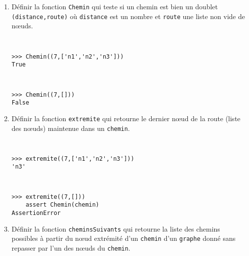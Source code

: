 \begin{question}\label{question:suivants}\mbox{}
\begin{enumerate}
\item Définir la fonction \texttt{Chemin} qui teste si un chemin est bien un doublet
	\texttt{(distance,route)} où \texttt{distance} est un nombre et \texttt{route} une liste 
	non vide de n\oe uds.

\noindent\begin{minipage}[t]{6cm}\tt\footnotesize
\begin{Verbatim}
>>> Chemin((7,['n1','n2','n3']))
True
\end{Verbatim}
\end{minipage}
\hfill
\begin{minipage}[t]{6cm}\tt\footnotesize
\begin{Verbatim}
>>> Chemin((7,[]))
False
\end{Verbatim}
\end{minipage}
\vspace*{2mm}

\item Définir la fonction \texttt{extremite} qui retourne le dernier n\oe ud de la route
	(liste des n\oe uds) maintenue dans un \texttt{chemin}.

\noindent\begin{minipage}[t]{6cm}\tt\footnotesize
\begin{Verbatim}
>>> extremite((7,['n1','n2','n3']))
'n3'
\end{Verbatim}
\end{minipage}
\hfill
\begin{minipage}[t]{6cm}\tt\footnotesize
\begin{Verbatim}
>>> extremite((7,[]))
    assert Chemin(chemin)
AssertionError
\end{Verbatim}
\end{minipage}
\vspace*{2mm}

\item Définir la fonction \texttt{cheminsSuivants} qui retourne la liste
	des chemins possibles à partir du n\oe ud extrémité d'un \texttt{chemin}
	d'un \texttt{graphe} donné sans repasser par l'un des n\oe uds du \texttt{chemin}.


\end{enumerate}
\end{question}
